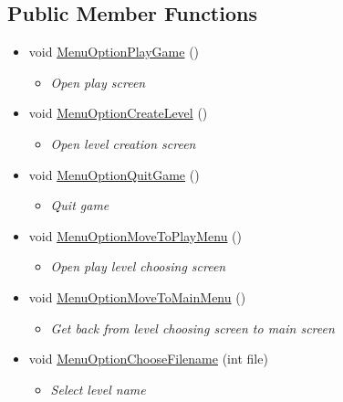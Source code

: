 \subsection*{Public Member Functions}
\begin{itemize}
\item[]  
void \mbox{\hyperlink{classRacingGameBot_1_1Menu_1_1MainMenu_a887833310427a90ded2cce76fd4c327e}{MenuOptionPlayGame}} ()
\begin{itemize}\small\item[] \em Open play screen \end{itemize}\item[]  
void \mbox{\hyperlink{classRacingGameBot_1_1Menu_1_1MainMenu_a171838b0e899d4ff7f69f17f9d8493f0}{MenuOptionCreateLevel}} ()
\begin{itemize}\small\item[] \em Open level creation screen \end{itemize}\item[]  
void \mbox{\hyperlink{classRacingGameBot_1_1Menu_1_1MainMenu_a10fc2fc042f1cafd3c7d41e9674fd306}{MenuOptionQuitGame}} ()
\begin{itemize}\small\item[] \em Quit game \end{itemize}\item[]  
void \mbox{\hyperlink{classRacingGameBot_1_1Menu_1_1MainMenu_ad6661998082e12ba4147b71fcf20a238}{MenuOptionMoveToPlayMenu}} ()
\begin{itemize}\small\item[] \em Open play level choosing screen \end{itemize}\item[]  
void \mbox{\hyperlink{classRacingGameBot_1_1Menu_1_1MainMenu_a2fa3418e23de32ab9aa22a1214e32c48}{MenuOptionMoveToMainMenu}} ()
\begin{itemize}\small\item[] \em Get back from level choosing screen to main screen \end{itemize}\item[]  
void \mbox{\hyperlink{classRacingGameBot_1_1Menu_1_1MainMenu_aa4a7ca98389901423bd5759b4f59b1bb}{MenuOptionChooseFilename}} (int file)
\begin{itemize}\small\item[] \em Select level name \end{itemize}\end{itemize}
